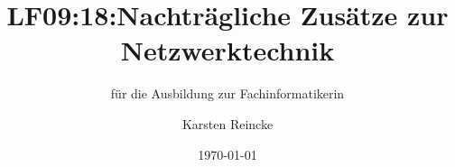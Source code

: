 \documentclass[]{beamer}
\title{LF09:18:Nachträgliche Zusätze zur Netzwerktechnik}
\subtitle{für die Ausbildung zur Fachinformatikerin}
\institute[GS-LDK]{Gewerbliche Schulen Dillenburg}
\author{Karsten Reincke}
\date{\today}
\def\cfgGl{../../../cfg.gl/}
\begin{document}

\begin{frame}
  \titlepage

  
\end{frame}






\logo{}
\newpage



%
\end{document}
